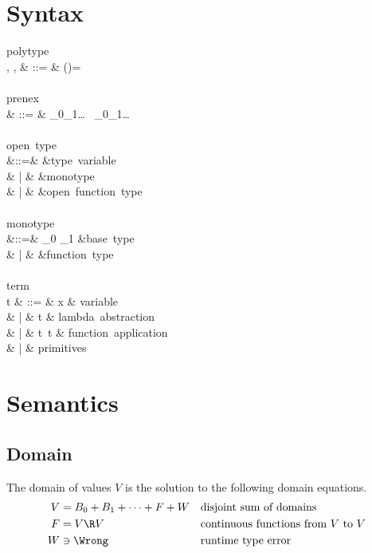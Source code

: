 \documentclass{amsart}
\begin{document}
\section{Syntax}

\begin{syntax}
\mbox{polytype}\\
\rho, \sigma, \tau & ::= 
& \pi \quad {}\quad\FTV(\pi)=\emptyset
\\
\\
\mbox{prenex}\\
\pi & ::= &
\forall \alpha_0\alpha_1\ldots~
\exists \beta_0\beta_1\ldots~\theta
\\
\\
\mbox{open type}\\
\theta
&::=& \alpha \Or \beta \Or \gamma \Or \cdots &\mbox{type variable}\\
& | & \mu &\mbox{monotype}\\
& | & \theta \R \theta &\mbox{open function type}
\\
\\
\mbox{monotype}\\
\mu
&::=& \iota_0 \Or \iota_1 \Or \cdots &\mbox{base type}\\
& | & \mu \R \mu &\mbox{function type}
\\
\\
\mbox{term}\\
t & ::= & x & \mbox{variable} \\
& | & t  & \mbox{lambda abstraction} \\
& | & t~t & \mbox{function application} \\
& | & \mbox{primitives}
\end{syntax}

\section{Semantics}

\subsection*{Domain}
The domain of values $V$ is the solution to the following domain
equations.
\begin{align*}
V &= B_0 + B_1 + \cdots + F + W
  &&\mbox{disjoint sum of domains}\\
F &= V \R V &&\mbox{continuous functions from $V$ to $V$}\\
W &\ni \Wrong &&\mbox{runtime type error}
\end{align*}
\end{document}
